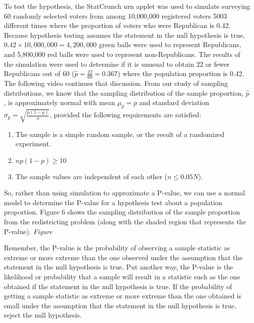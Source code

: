 \documentclass{report}
\begin{document}
    \bigbreak \noindent 
    To test the hypothesis, the StatCrunch urn applet was used to simulate surveying 60 randomly selected voters from among 10,000,000 registered voters 5003 different times where the proportion of voters who were Republican is 0.42. Because hypothesis testing assumes the statement in the null hypothesis is true, $0.42 \times 10,000,000 = 4,200,000$ green balls were used to represent Republicans, and 5,800,000 red balls were used to represent non-Republicans.
    \bigbreak \noindent 
    The results of the simulation were used to determine if it is unusual to obtain 22 or fewer Republicans out of 60 ($\hat{p} = \frac{22}{60} = 0.367$) where the population proportion is 0.42. The following video continues that discussion.
    \bigbreak \noindent 
    From our study of sampling distributions, we know that the sampling distribution of the sample proportion, $\hat{p}$, is approximately normal with mean $\mu_{\hat{p}}=p$ and standard deviation $\sigma_{\hat{p}}=\sqrt{\frac{p(1-p)}{n}}$, provided the following requirements are satisfied:
    \bigbreak \noindent 
    \begin{enumerate}
        \item The sample is a simple random sample, or the result of a randomized experiment.
        \item $np(1-p) \geq 10$
        \item The sample values are independent of each other ($n \leq 0.05N$).
    \end{enumerate}
    \bigbreak \noindent 
    So, rather than using simulation to approximate a P-value, we can use a normal model to determine the P-value for a hypothesis test about a population proportion. Figure 6 shows the sampling distribution of the sample proportion from the redistricting problem (along with the shaded region that represents the P-value).
    \bigbreak \noindent 
    \textit{Figure}
    \begin{figure}[ht]
        \centering
        \label{fig:aoeu}
    \end{figure}
    \bigbreak \noindent 
    Remember, the P-value is the probability of observing a sample statistic as extreme or more extreme than the one observed under the assumption that the statement in the null hypothesis is true. Put another way, the P-value is the likelihood or probability that a sample will result in a statistic such as the one obtained if the statement in the null hypothesis is true.
    \bigbreak \noindent 
    If the probability of getting a sample statistic as extreme or more extreme than the one obtained is small under the assumption that the statement in the null hypothesis is true, reject the null hypothesis.
\end{document}
